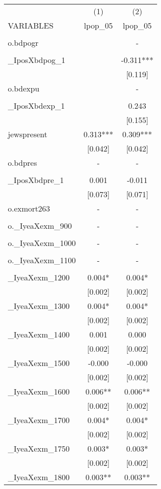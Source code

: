 \documentclass[landscape]{article}
\begin{document}
\begin{tabular}{lcc} \hline
 & (1) & (2) \\
VARIABLES & lpop\_05 & lpop\_05 \\ \hline
 &  &  \\
o.bdpogr &  & - \\
 &  &  \\
\_IposXbdpog\_1 &  & -0.311*** \\
 &  & [0.119] \\
o.bdexpu &  & - \\
 &  &  \\
\_IposXbdexp\_1 &  & 0.243 \\
 &  & [0.155] \\
jewspresent & 0.313*** & 0.309*** \\
 & [0.042] & [0.042] \\
o.bdpres & - & - \\
 &  &  \\
\_IposXbdpre\_1 & 0.001 & -0.011 \\
 & [0.073] & [0.071] \\
o.exmort263 & - & - \\
 &  &  \\
o.\_IyeaXexm\_900 & - & - \\
 &  &  \\
o.\_IyeaXexm\_1000 & - & - \\
 &  &  \\
o.\_IyeaXexm\_1100 & - & - \\
 &  &  \\
\_IyeaXexm\_1200 & 0.004* & 0.004* \\
 & [0.002] & [0.002] \\
\_IyeaXexm\_1300 & 0.004* & 0.004* \\
 & [0.002] & [0.002] \\
\_IyeaXexm\_1400 & 0.001 & 0.000 \\
 & [0.002] & [0.002] \\
\_IyeaXexm\_1500 & -0.000 & -0.000 \\
 & [0.002] & [0.002] \\
\_IyeaXexm\_1600 & 0.006** & 0.006** \\
 & [0.002] & [0.002] \\
\_IyeaXexm\_1700 & 0.004* & 0.004* \\
 & [0.002] & [0.002] \\
\_IyeaXexm\_1750 & 0.003* & 0.003* \\
 & [0.002] & [0.002] \\
\_IyeaXexm\_1800 & 0.003** & 0.003** \\

\end{tabular}
\end{document}
